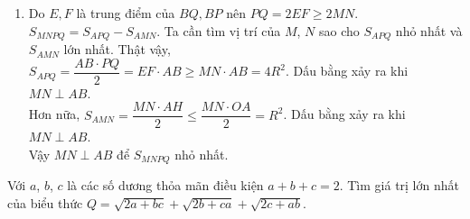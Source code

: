 \begin{ex}
{\begin{enumerate}
Ta lại có $OF \perp OE$ và $AP \perp AQ$ nên $OF \parallel AP$.\\
Trong tam giác $ABP$ có $O$ là trung điểm $AB$ và $OF \parallel AP$ nên $F$ là trung điểm $BP$.\\
Ta có $\widehat{MEF} = \dfrac{1}{2}(\text{sđ } \wideparen{MAB}-\text{sđ }\wideparen{MB})$ và $\widehat{NFE} = \dfrac{1}{2}(\text{sđ }\wideparen{BAN}-\text{sđ }\wideparen{BN})$.\\
Do đó $\widehat{MEF}+\widehat{NFE} = \text{sđ }\wideparen{MAN}=180^\circ \Rightarrow ME \parallel NF$ (góc trong cùng phía bù nhau).
\item Do $E,F$ là trung điểm của $BQ,BP$ nên $PQ = 2EF \geq 2MN$.\\
$S_{MNPQ} = S_{APQ} - S_{AMN}$. Ta cần tìm vị trí của $M$, $N$ sao cho $S_{APQ}$ nhỏ nhất và $S_{AMN}$ lớn nhất. Thật vậy,\\
$S_{APQ} = \dfrac{AB\cdot PQ}{2} = EF\cdot AB \geq MN\cdot AB = 4R^2$. Dấu bằng xảy ra khi $MN\perp AB$.\\
Hơn nữa, $S_{AMN} = \dfrac{MN\cdot AH}{2} \leq \dfrac{MN\cdot OA}{2} = R^2$. Dấu bằng xảy ra khi $MN \perp AB$.\\
Vậy $MN \perp AB$ để $S_{MNPQ}$ nhỏ nhất.
\end{enumerate}
}	
\end{ex}  
\begin{ex}%
Với $a$, $b$, $c$ là các số dương thỏa mãn điều kiện $a+b+c=2$. Tìm giá trị lớn nhất của biểu thức 	$Q=\sqrt{2a+bc}+\sqrt{2b+ca}+\sqrt{2c+ab}$.
\end{ex}

